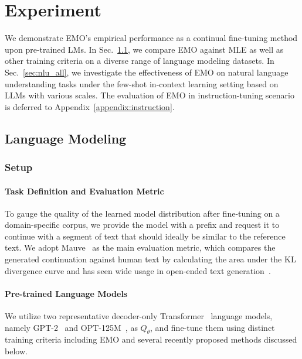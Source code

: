 \section{Experiment}
We demonstrate EMO's empirical performance as a continual fine-tuning method upon pre-trained LMs. In Sec.~\ref{sec:generation}, we compare EMO against MLE as well as other training criteria on a diverse range of language modeling datasets. In Sec.~\ref{sec:nlu_all}, we 
investigate the effectiveness of EMO on natural language understanding tasks under the few-shot in-context learning setting based on LLMs with various scales. The evaluation of EMO in instruction-tuning scenario is deferred to Appendix~\ref{appendix:instruction}.
\subsection{Language Modeling}
\label{sec:generation}
\subsubsection{Setup}
\label{sec:main_setup}
\paragraph{Task Definition and Evaluation Metric} 
To gauge the quality of the learned model distribution after fine-tuning on a domain-specific corpus, we provide the model with a prefix and request it to continue with a segment of text that should ideally be similar to the reference text. We adopt Mauve~\citep{mauve} as the main evaluation metric, which compares the generated continuation against human text by calculating the area under
the KL divergence curve and has seen wide usage in open-ended text generation~\citep{tailr,mixce,meister-etal-2023-efficacy}.
\paragraph{Pre-trained Language Models}
We utilize two representative decoder-only Transformer~\citep{transformer} language models, namely GPT-2~\citep{gpt2} and OPT-125M~\citep{opt}, as $Q_{\theta}$, and fine-tune them using distinct training criteria including EMO and several recently proposed methods discussed below.
